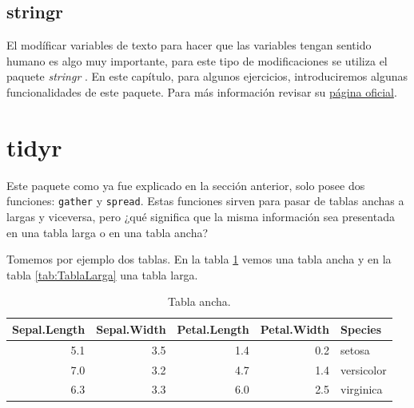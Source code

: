 \documentclass[]{book}
\begin{document}
\hypertarget{stringr}{%
\subsection{stringr}\label{stringr}}

El modíficar variables de texto para hacer que las variables tengan
sentido humano es algo muy importante, para este tipo de modificaciones
se utiliza el paquete \emph{stringr} \citep{Wickhamstringr}. En este
capítulo, para algunos ejercicios, introduciremos algunas
funcionalidades de este paquete. Para más información revisar su
\href{https://stringr.tidyverse.org/}{página oficial}.

\hypertarget{tidyr-1}{%
\section{tidyr}\label{tidyr-1}}

Este paquete como ya fue explicado en la sección anterior, solo posee
dos funciones: \texttt{gather} y \texttt{spread}. Estas funciones sirven
para pasar de tablas anchas a largas y viceversa, pero ¿qué significa
que la misma información sea presentada en una tabla larga o en una
tabla ancha?

Tomemos por ejemplo dos tablas. En la tabla \ref{tab:TablaAncha} vemos
una tabla ancha y en la tabla \ref{tab:TablaLarga} una tabla larga.

\begin{table}

\caption{\label{tab:TablaAncha}Tabla ancha.}
\centering
\begin{tabular}[t]{rrrrl}
\toprule
Sepal.Length & Sepal.Width & Petal.Length & Petal.Width & Species\\
\midrule
5.1 & 3.5 & 1.4 & 0.2 & setosa\\
7.0 & 3.2 & 4.7 & 1.4 & versicolor\\
6.3 & 3.3 & 6.0 & 2.5 & virginica\\
\bottomrule
\end{tabular}
\end{table}
\end{document}

